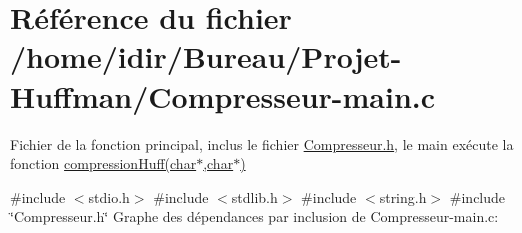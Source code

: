\hypertarget{_compresseur-main_8c}{}\section{Référence du fichier /home/idir/\+Bureau/\+Projet-\/\+Huffman/\+Compresseur-\/main.c}
\label{_compresseur-main_8c}


Fichier de la fonction principal, inclus le fichier \hyperlink{_compresseur_8h}{Compresseur.\+h}, le main exécute la fonction \hyperlink{_compresseur_8h_ab5ba22dc27e48a9c0bd21beacd7fb38e}{compression\+Huff(char$\ast$,char$\ast$)}  


{\ttfamily \#include $<$stdio.\+h$>$}\newline
{\ttfamily \#include $<$stdlib.\+h$>$}\newline
{\ttfamily \#include $<$string.\+h$>$}\newline
{\ttfamily \#include \char`\"{}Compresseur.\+h\char`\"{}}\newline
Graphe des dépendances par inclusion de Compresseur-\/main.c\+:
